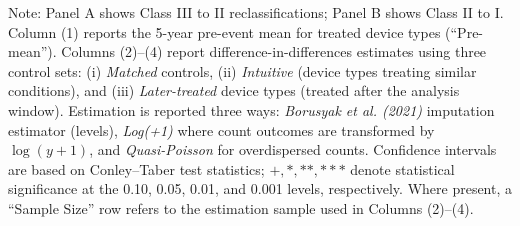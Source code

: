 \documentclass[letterpaper,12pt]{article}
\theoremstyle{definition}
\begin{document}
\begin{table}[t]
\begin{threeparttable}
\begin{tablenotes}\footnotesize
\item[] Note: Panel A shows Class III to II reclassifications; Panel B shows Class II to I. Column (1) reports the 5-year pre-event mean for treated device types (``Pre-mean''). Columns (2)–(4) report difference-in-differences estimates using three control sets: (i) \emph{Matched} controls, (ii) \emph{Intuitive} (device types treating similar conditions), and (iii) \emph{Later-treated} device types (treated after the analysis window). 
Estimation is reported three ways: \emph{Borusyak et al. (2021)} imputation estimator (levels), \emph{Log(+1)} where count outcomes are transformed by $\log(y+1)$, and \emph{Quasi-Poisson} for overdispersed counts. Confidence intervals are based on Conley–Taber test statistics; $+,*,**,***$ denote statistical significance at the 0.10, 0.05, 0.01, and 0.001 levels, respectively. Where present, a ``Sample Size'' row refers to the estimation sample used in Columns (2)–(4).
\end{tablenotes}
\end{threeparttable}
\label{tab:Robustness_Innovation}
\end{table}

\clearpage
\newpage
\end{document}
